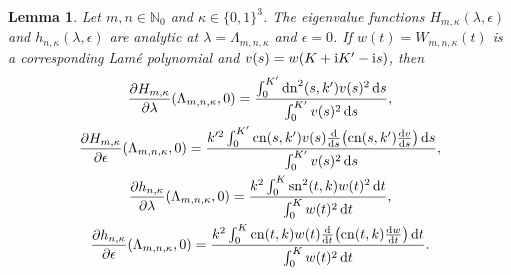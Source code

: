 \documentclass[10pt,a4paper]{amsart}
\newtheorem{Lemma}[thm]{Lemma}
\newcommand{\N}{\mathbb{N}}
\DeclareMathOperator{\sn}{sn}
\DeclareMathOperator{\cn}{cn}
\DeclareMathOperator{\dn}{dn}
\numberwithin{equation}{section}
\begin{document}
\begin{Lemma}\label{derivatives1}
Let $m,n\in\N_0$ and $\kappa\in\{0,1\}^3$. The eigenvalue functions $H_{m,\kappa}(\lambda,\epsilon)$ and $h_{n,\kappa}(\lambda,\epsilon)$
are analytic at $\lambda=\Lambda_{m,n,\kappa}$ and $\epsilon=0$.
If $w(t)=W_{m,n,\kappa}(t)$ is a corresponding Lam\'e polynomial and $v(s)=w(K+{\rm i}K'-{\rm i}s)$, then
\begin{gather}
 \frac{\partial H_{m,\kappa}}{\partial \lambda}(\Lambda_{m,n,\kappa},0) =
\frac{\int_0^{K'} \dn^2(s,k')v(s)^2\,{\rm d}s}{\int_0^{K'}v(s)^2\,{\rm d}s}, \label{deriv1}\\
\frac{\partial H_{m,\kappa}}{\partial \epsilon}(\Lambda_{m,n,\kappa},0) =
\frac{k'^2\int_0^{K'} \cn(s,k') v(s)\frac{{\rm d}}{{\rm d}s}\bigl(\cn(s,k')\frac{{\rm d}v}{{\rm d}s}\bigr)\,{\rm d}s}{\int_0^{K'} v(s)^2\,{\rm d}s},\label{deriv2}\\
 \frac{\partial h_{n,\kappa}}{\partial \lambda}(\Lambda_{m,n,\kappa},0) =
\frac{k^2\int_0^K \sn^2(t,k)w(t)^2\,{\rm d}t}{\int_0^K w(t)^2\,{\rm d}t},\label{deriv3}\\
\frac{\partial h_{n,\kappa}}{\partial \epsilon}(\Lambda_{m,n,\kappa},0) =
\frac{k^2\int_0^K \cn(t,k) w(t)\frac{{\rm d}}{{\rm d}t}\bigl(\cn(t,k)\frac{{\rm d}w}{{\rm d}t}\bigr)\,{\rm d}t}{\int_0^K w(t)^2\,{\rm d}t}.\label{deriv4}
\end{gather}
\end{Lemma}
\end{document}
